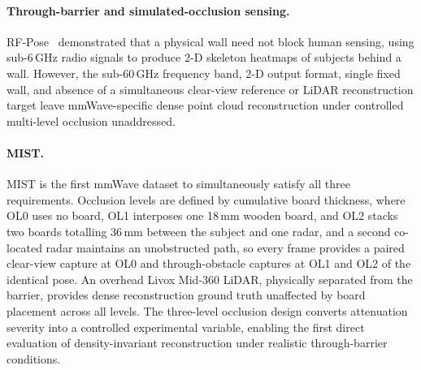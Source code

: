 \documentclass{article}
\begin{document}
\paragraph{Through-barrier and simulated-occlusion sensing.}
RF-Pose~\cite{zhao2018through} demonstrated that a physical wall need not block human sensing, using
sub-6\,GHz radio signals to produce 2-D skeleton heatmaps of subjects behind a wall.
However, the sub-60\,GHz frequency band, 2-D output format, single fixed wall, and absence
of a simultaneous clear-view reference or LiDAR reconstruction target leave mmWave-specific
dense point cloud reconstruction under controlled multi-level occlusion unaddressed.

\paragraph{MIST.}
MIST is the first mmWave dataset to simultaneously satisfy all three requirements.
Occlusion levels are defined by cumulative board thickness, where OL0 uses no board,
OL1 interposes one 18\,mm wooden board, and OL2 stacks two boards totalling 36\,mm between
the subject and one radar, and a second co-located radar maintains an unobstructed path, so
every frame provides a paired clear-view capture at OL0 and through-obstacle captures at OL1
and OL2 of the identical pose.
An overhead Livox Mid-360 LiDAR, physically separated from the barrier, provides dense
reconstruction ground truth unaffected by board placement across all levels.
The three-level occlusion design converts attenuation severity into a controlled experimental
variable, enabling the first direct evaluation of density-invariant reconstruction under
realistic through-barrier conditions.
\end{document}
